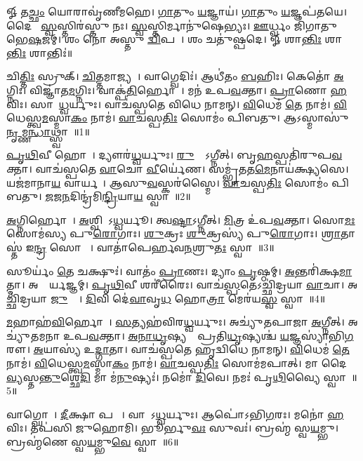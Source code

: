 \setcounter{anuvakam}{0}
𑍐 𑌤\ul{𑌚𑍍𑌛𑌂} 𑌯𑍋𑌰𑌾𑌵𑍃॑𑌣𑍀𑌮𑌹𑍇। 
\ul{𑌗𑌾}𑌤𑍁𑌂 \ul{𑌯}𑌜𑍍𑌞𑌾𑌯॑। 
\ul{𑌗𑌾}𑌤𑍁𑌂 \ul{𑌯}𑌜𑍍𑌞𑌪॑𑌤𑌯𑍇। 
𑌦𑍈𑌵𑍀𑌃᳚ \ul{𑌸𑍍𑌵}𑌸𑍍𑌤𑌿𑌰॑𑌸𑍍𑌤𑍁 𑌨𑌃। 
\ul{𑌸𑍍𑌵}𑌸𑍍𑌤𑌿𑌰𑍍𑌮𑌾𑌨𑍁॑𑌷𑍇𑌭𑍍𑌯𑌃। 
\ul{𑌊}𑌰𑍍𑌧𑍍𑌵𑌂 𑌜𑌿॑𑌗𑌾𑌤𑍁 𑌭𑍇\ul{𑌷}𑌜𑌮𑍍। 
𑌶𑌂 𑌨𑍋॑ 𑌅𑌸𑍍𑌤𑍁 \ul{𑌦𑍍𑌵𑌿}𑌪𑌦𑍇᳚। 
𑌶𑌂 𑌚𑌤𑍁॑𑌷𑍍𑌪𑌦𑍇। 
𑍐 𑌶𑌾\ul{𑌨𑍍𑌤𑌿𑌃} 𑌶𑌾\ul{𑌨𑍍𑌤𑌿𑌃} 𑌶𑌾𑌨𑍍𑌤𑌿𑌃॑॥

𑌚𑌿\ul{𑌤𑍍𑌤𑌿𑌃} 𑌸𑍍𑌰𑍁𑌕𑍍। 
\ul{𑌚𑌿}𑌤𑍍𑌤𑌮𑌾𑌜𑍍𑌯𑌮𑍍᳚। 
𑌵𑌾𑌗𑍍𑌵𑍇𑌦𑌿𑌃॑। 
𑌆𑌧𑍀॑𑌤𑌂 \ul{𑌬}\ar{}𑌹𑌿𑌃। 
𑌕𑍇𑌤𑍋॑ \ul{𑌅}𑌗𑍍𑌨𑌿𑌃। 
𑌵𑌿𑌜𑍍𑌞𑌾॑𑌤\ul{𑌮}𑌗𑍍𑌨𑌿𑌃। 
𑌵𑌾𑌕𑍍𑌪॑\ul{𑌤𑌿}𑌰𑍍\mbox{}𑌹𑍋𑌤𑌾᳚। 
𑌮𑌨॑ 𑌉𑌪\ul{𑌵}𑌕𑍍𑌤𑌾। 
\ul{𑌪𑍍𑌰𑌾}𑌣𑍋 \ul{𑌹}𑌵𑌿𑌃। 
𑌸𑌾𑌮𑌾᳚\ul{𑌧𑍍𑌵}𑌰𑍍𑌯𑍁𑌃। 
𑌵𑌾𑌚॑𑌸𑍍𑌪𑌤𑍇 𑌵𑌿𑌧𑍇 𑌨𑌾𑌮𑌨𑍍। 
\ul{𑌵𑌿}𑌧𑍇𑌮॑ \ul{𑌤𑍇} 𑌨𑌾𑌮॑। 
\ul{𑌵𑌿}𑌧𑍇𑌸𑍍𑌤𑍍𑌵\ul{𑌮}𑌸𑍍𑌮𑌾\ul{𑌕𑌂} 𑌨𑌾𑌮॑। 
\ul{𑌵𑌾}𑌚𑌸𑍍𑌪\ul{𑌤𑌿𑌃} 𑌸𑍋𑌮𑌂॑ 𑌪𑌿𑌬𑌤𑍁। 
𑌆𑌽𑌸𑍍𑌮𑌾𑌸𑍁॑ \ul{𑌨𑍃}𑌮𑍍𑌣\ul{𑌨𑍍𑌧𑌾}𑌥𑍍𑌸𑍍𑌵𑌾𑌹𑌾᳚॥1॥
\anuvakamend[\ul{𑌅}\ul{𑌧𑍍𑌵}𑌰𑍍𑌯𑍁𑌃 𑌪𑌞𑍍𑌚॑ 𑌚]

\ul{𑌪𑍃}\ul{𑌥𑌿}𑌵𑍀 𑌹𑍋𑌤𑌾᳚। 
𑌦𑍍𑌯𑍗𑌰॑\ul{𑌧𑍍𑌵}𑌰𑍍𑌯𑍁𑌃। 
\ul{𑌰𑍁}𑌦𑍍𑌰𑍋᳚𑌽𑌗𑍍𑌨𑍀𑌤𑍍। 
𑌬𑍃\ul{𑌹}𑌸𑍍𑌪𑌤𑌿॑𑌰𑍁𑌪\ul{𑌵}𑌕𑍍𑌤𑌾। 
𑌵𑌾𑌚॑𑌸𑍍𑌪𑌤𑍇 \ul{𑌵𑌾}𑌚𑍋 \ul{𑌵𑍀}𑌰𑍍𑌯𑍇॑𑌣। 
𑌸𑌮𑍍𑌭𑍃॑𑌤𑌤\ul{𑌮𑍇}𑌨𑌾𑌯॑𑌕𑍍𑌷𑍍𑌯𑌸𑍇। 
𑌯𑌜॑𑌮𑌾𑌨𑌾\ul{𑌯} 𑌵𑌾𑌰𑍍𑌯𑌮𑍍᳚। 
𑌆𑌸𑍁\ul{𑌵}𑌸𑍍𑌕𑌰॑𑌸𑍍𑌮𑍈। 
\ul{𑌵𑌾}𑌚𑌸𑍍𑌪\ul{𑌤𑌿𑌃} 𑌸𑍋𑌮𑌂॑ 𑌪𑌿𑌬𑌤𑍁। 
\ul{𑌜}𑌜\ul{𑌨}𑌦𑌿𑌨𑍍𑌦𑍍𑌰॑\-𑌮𑌿\ul{𑌨𑍍𑌦𑍍𑌰𑌿}𑌯𑌾\ul{𑌯} 𑌸𑍍𑌵𑌾𑌹𑌾᳚॥2॥%
\anuvakamend[\ul{𑌪𑍃}\ul{𑌥𑌿}𑌵𑍀 𑌹𑍋\ul{𑌤𑌾} 𑌦𑌶॑]

\ul{𑌅}𑌗𑍍𑌨𑌿𑌰𑍍\mbox{}𑌹𑍋𑌤𑌾᳚। 
\ul{𑌅}𑌶𑍍𑌵𑌿𑌨𑌾᳚𑌽\ul{𑌧𑍍𑌵}𑌰𑍍𑌯𑍂। 
𑌤𑍍𑌵\ul{𑌷𑍍𑌟𑌾}𑌽𑌗𑍍𑌨𑍀𑌤𑍍। 
\ul{𑌮𑌿}𑌤𑍍𑌰 𑌉॑𑌪\ul{𑌵}𑌕𑍍𑌤𑌾। 
𑌸𑍋\ul{𑌮𑌃} 𑌸𑍋𑌮॑𑌸𑍍𑌯 𑌪𑍁\ul{𑌰𑍋}𑌗𑌾𑌃। 
\ul{𑌶𑍁}𑌕𑍍𑌰𑌃  \ul{𑌶𑍁}𑌕𑍍𑌰𑌸𑍍𑌯॑ 𑌪𑍁\ul{𑌰𑍋}𑌗𑌾𑌃। 
\ul{𑌶𑍍𑌰𑌾}𑌤𑌾𑌸𑍍𑌤॑ 𑌇\ul{𑌨𑍍𑌦𑍍𑌰} 𑌸𑍋𑌮𑌾𑌃᳚। 
𑌵𑌾𑌤𑌾॑𑌪𑍇𑌰𑍍\mbox{}𑌹𑌵\ul{𑌨}𑌶𑍍𑌰𑍁\ul{𑌤𑌃} 𑌸𑍍𑌵𑌾𑌹𑌾᳚॥3॥%
\anuvakamend[\ul{𑌅}𑌗𑍍𑌨𑌿𑌰𑍍𑌹𑍋\ul{𑌤𑌾}𑌽𑌷𑍍𑌟𑍗]

𑌸𑍂𑌰𑍍𑌯𑌂॑ \ul{𑌤𑍇} 𑌚𑌕𑍍𑌷𑍁𑌃॑। 
𑌵𑌾𑌤𑌂॑ \ul{𑌪𑍍𑌰𑌾}𑌣𑌃। 
𑌦𑍍𑌯𑌾𑌂 \ul{𑌪𑍃}𑌷𑍍𑌠𑌮𑍍। 
\ul{𑌅}𑌨𑍍𑌤𑌰𑌿॑𑌕𑍍𑌷\ul{𑌮𑌾}𑌤𑍍𑌮𑌾। 
𑌅𑌙𑍍𑌗𑍈᳚𑌰𑍍\mbox{}\ul{𑌯}𑌜𑍍𑌞𑌮𑍍। 
\ul{𑌪𑍃}\ul{𑌥𑌿}𑌵𑍀 𑌶𑌰𑍀॑𑌰𑍈𑌃। 
𑌵𑌾𑌚॑\ul{𑌸𑍍𑌪}𑌤𑍇𑌽𑌚𑍍𑌛𑌿॑𑌦𑍍𑌰𑌯𑌾 \ul{𑌵𑌾}𑌚𑌾। 
𑌅𑌚𑍍𑌛𑌿॑𑌦𑍍𑌰𑌯𑌾 \ul{𑌜𑍁}𑌹𑍍𑌵𑌾᳚। 
\ul{𑌦𑌿}𑌵𑌿 𑌦𑍇॑\ul{𑌵𑌾}𑌵𑍃\ul{𑌧}\ul{} 𑌹𑍋\ul{𑌤𑍍𑌰𑌾} 𑌮𑍇𑌰॑𑌯\ul{𑌸𑍍𑌵} 𑌸𑍍𑌵𑌾𑌹𑌾᳚॥4॥
\anuvakamend[𑌸𑍂𑌰𑍍𑌯𑌂॑ \ul{𑌤𑍇} 𑌨𑌵॑]

\ul{𑌮}𑌹𑌾𑌹॑\ul{𑌵𑌿}𑌰𑍍\mbox{}𑌹𑍋𑌤𑌾᳚। 
\ul{𑌸}𑌤𑍍𑌯𑌹॑𑌵𑌿𑌰\ul{𑌧𑍍𑌵}𑌰𑍍𑌯𑍁𑌃। 
𑌅𑌚𑍍𑌯𑍁॑𑌤𑌪𑌾𑌜𑌾 \ul{𑌅}𑌗𑍍𑌨𑍀𑌤𑍍। 
𑌅𑌚𑍍𑌯𑍁॑𑌤𑌮𑌨𑌾 𑌉𑌪\ul{𑌵}𑌕𑍍𑌤𑌾। 
\ul{𑌅}\ul{𑌨𑌾}\ul{𑌧𑍃}𑌷𑍍𑌯𑌶𑍍𑌚𑌾᳚𑌪𑍍𑌰𑌤𑌿\ul{𑌧𑍃}𑌷𑍍𑌯𑌶𑍍𑌚॑ \ul{𑌯}𑌜𑍍𑌞𑌸𑍍𑌯𑌾॑𑌭𑌿\ul{𑌗}𑌰𑍗। 
\ul{𑌅}𑌯𑌾𑌸𑍍𑌯॑ 𑌉\ul{𑌦𑍍𑌗𑌾}𑌤𑌾। 
𑌵𑌾𑌚॑𑌸𑍍𑌪𑌤𑍇 𑌹𑍃𑌦𑍍𑌵𑌿𑌧𑍇 𑌨𑌾𑌮𑌨𑍍। 
\ul{𑌵𑌿}𑌧𑍇𑌮॑ \ul{𑌤𑍇} 𑌨𑌾𑌮॑। 
\ul{𑌵𑌿}𑌧𑍇𑌸𑍍𑌤𑍍𑌵\ul{𑌮}𑌸𑍍𑌮𑌾\ul{𑌕𑌂} 𑌨𑌾𑌮॑। 
\ul{𑌵𑌾}𑌚𑌸𑍍𑌪\ul{𑌤𑌿𑌃} 𑌸𑍋𑌮॑𑌮𑌪𑌾𑌤𑍍। 
𑌮𑌾 𑌦𑍈\ul{𑌵𑍍𑌯}𑌸𑍍𑌤\ul{𑌨𑍍𑌤𑍁}𑌶𑍍𑌛𑍇\ul{𑌦𑌿} 𑌮𑌾 𑌮॑\ul{𑌨𑍁}𑌷𑍍𑌯𑌃॑। 
𑌨𑌮𑍋॑ \ul{𑌦𑌿}𑌵𑍇। 
𑌨𑌮𑌃॑ 𑌪𑍃\ul{𑌥𑌿}𑌵𑍍𑌯𑍈 𑌸𑍍𑌵𑌾𑌹𑌾᳚॥5॥%
\anuvakamend[\ul{𑌅}\ul{𑌪𑌾}𑌤𑍍𑌤𑍍𑌰𑍀𑌣𑌿॑ 𑌚]

𑌵𑌾𑌗𑍍𑌘𑍋𑌤𑌾᳚। 
\ul{𑌦𑍀}𑌕𑍍𑌷𑌾 𑌪𑌤𑍍𑌨𑍀᳚। 
𑌵𑌾𑌤𑍋᳚𑌽\ul{𑌧𑍍𑌵}𑌰𑍍𑌯𑍁𑌃। 
𑌆𑌪𑍋॑𑌽𑌭𑌿\ul{𑌗}𑌰𑌃। 
𑌮𑌨𑍋॑ \ul{𑌹}𑌵𑌿𑌃। 
𑌤𑌪॑𑌸𑌿 𑌜𑍁𑌹𑍋𑌮𑌿। 
𑌭𑍂𑌰𑍍𑌭𑍁\ul{𑌵𑌃} 𑌸𑍁𑌵𑌃॑। 
𑌬𑍍𑌰𑌹𑍍𑌮॑ 𑌸𑍍𑌵\ul{𑌯}𑌮𑍍𑌭𑍁। 
𑌬𑍍𑌰𑌹𑍍𑌮॑𑌣𑍇 𑌸𑍍𑌵\ul{𑌯}𑌮𑍍𑌭𑍁\ul{𑌵𑍇} 𑌸𑍍𑌵𑌾𑌹𑌾᳚॥6॥
\anuvakamend[𑌵𑌾𑌗𑍍𑌘𑍋\ul{𑌤𑌾} 𑌨𑌵॑]

